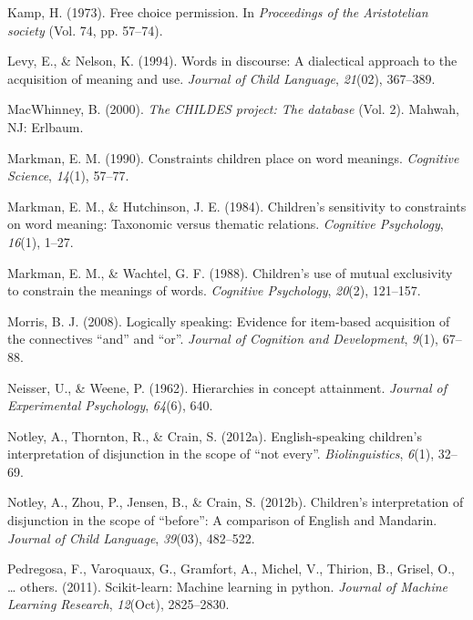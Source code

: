 \documentclass[,man,floatsintext]{apa6}
\begin{document}
\leavevmode\hypertarget{ref-kamp1973free}{}%
Kamp, H. (1973). Free choice permission. In \emph{Proceedings of the Aristotelian society} (Vol. 74, pp. 57--74).

\leavevmode\hypertarget{ref-levy1994words}{}%
Levy, E., \& Nelson, K. (1994). Words in discourse: A dialectical approach to the acquisition of meaning and use. \emph{Journal of Child Language}, \emph{21}(02), 367--389.

\leavevmode\hypertarget{ref-macwhinney2000childes}{}%
MacWhinney, B. (2000). \emph{The CHILDES project: The database} (Vol. 2). Mahwah, NJ: Erlbaum.

\leavevmode\hypertarget{ref-markman1990constraints}{}%
Markman, E. M. (1990). Constraints children place on word meanings. \emph{Cognitive Science}, \emph{14}(1), 57--77.

\leavevmode\hypertarget{ref-markman1984children}{}%
Markman, E. M., \& Hutchinson, J. E. (1984). Children's sensitivity to constraints on word meaning: Taxonomic versus thematic relations. \emph{Cognitive Psychology}, \emph{16}(1), 1--27.

\leavevmode\hypertarget{ref-markman1988children}{}%
Markman, E. M., \& Wachtel, G. F. (1988). Children's use of mutual exclusivity to constrain the meanings of words. \emph{Cognitive Psychology}, \emph{20}(2), 121--157.

\leavevmode\hypertarget{ref-morris2008logically}{}%
Morris, B. J. (2008). Logically speaking: Evidence for item-based acquisition of the connectives ``and'' and ``or''. \emph{Journal of Cognition and Development}, \emph{9}(1), 67--88.

\leavevmode\hypertarget{ref-neisser1962hierarchies}{}%
Neisser, U., \& Weene, P. (1962). Hierarchies in concept attainment. \emph{Journal of Experimental Psychology}, \emph{64}(6), 640.

\leavevmode\hypertarget{ref-notley2012notevery}{}%
Notley, A., Thornton, R., \& Crain, S. (2012a). English-speaking children's interpretation of disjunction in the scope of ``not every''. \emph{Biolinguistics}, \emph{6}(1), 32--69.

\leavevmode\hypertarget{ref-notley2012children}{}%
Notley, A., Zhou, P., Jensen, B., \& Crain, S. (2012b). Children's interpretation of disjunction in the scope of ``before'': A comparison of English and Mandarin. \emph{Journal of Child Language}, \emph{39}(03), 482--522.

\leavevmode\hypertarget{ref-pedregosa2011scikit}{}%
Pedregosa, F., Varoquaux, G., Gramfort, A., Michel, V., Thirion, B., Grisel, O., \ldots{} others. (2011). Scikit-learn: Machine learning in python. \emph{Journal of Machine Learning Research}, \emph{12}(Oct), 2825--2830.
\end{document}

